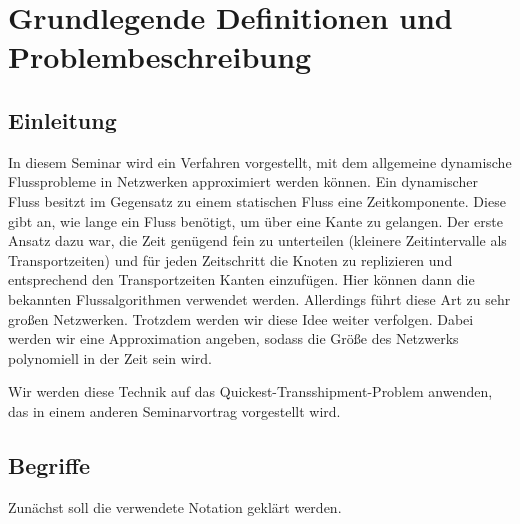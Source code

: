 
\section{Grundlegende Definitionen und Problembeschreibung}\label{sec:problem}

\subsection{Einleitung}

In diesem Seminar wird ein Verfahren vorgestellt, mit dem allgemeine dynamische
Flussprobleme in Netzwerken approximiert werden können. Ein dynamischer Fluss
besitzt im
Gegensatz zu einem statischen Fluss eine Zeitkomponente. Diese gibt an, wie
lange ein Fluss benötigt, um über eine Kante zu gelangen. Der erste Ansatz
dazu war, die Zeit genügend fein zu unterteilen (kleinere Zeitintervalle
als Transportzeiten) und für jeden Zeitschritt die Knoten zu replizieren und
entsprechend den Transportzeiten Kanten einzufügen. Hier können dann die
bekannten Flussalgorithmen verwendet werden. Allerdings führt diese Art
zu sehr großen Netzwerken. Trotzdem werden wir diese Idee weiter verfolgen.
Dabei werden wir eine Approximation angeben, sodass die Größe des Netzwerks
polynomiell in der Zeit sein wird.

Wir werden diese Technik auf das Quickest-Transshipment-Problem anwenden,
das in einem anderen Seminarvortrag vorgestellt wird.

\subsection{Begriffe}
Zunächst soll die verwendete Notation geklärt werden.

